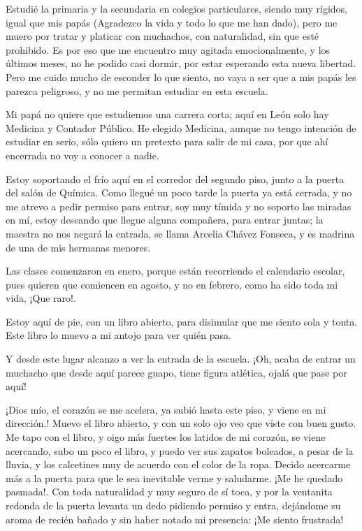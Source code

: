 \documentclass[letterpaper, 12pt]{book}
\begin{document}
Estudié la primaria y la secundaria en colegios particulares, siendo muy rígidos, igual que mis papás (Agradezco la vida y todo lo que me han dado), pero me muero por tratar y platicar con muchachos, con naturalidad, sin que esté prohibido. Es por eso que me encuentro muy agitada emocionalmente, y los últimos meses, no he podido casi dormir, por estar esperando esta nueva libertad. Pero me cuido mucho de esconder lo que siento, no vaya a ser que a mis papás les parezca peligroso, y no me permitan estudiar en esta escuela.

Mi papá no quiere que estudiemos una carrera corta; aquí en León solo hay Medicina y Contador Público. He elegido Medicina, aunque no tengo intención de estudiar en serio, sólo quiero un pretexto para salir de mi casa, por que ahí encerrada no voy a conocer a nadie.

Estoy soportando el frío aquí en el corredor del segundo piso, junto a la puerta del salón de Química. Como llegué un poco tarde la puerta ya está cerrada, y no me atrevo a pedir permiso para entrar, soy muy tímida y no soporto las miradas en mí, estoy deseando que llegue alguna compañera, para entrar juntas; la maestra no nos negará la entrada, se llama Arcelia Chávez Fonseca, y es madrina de una de mis hermanas menores.

Las clases comenzaron en enero, porque están recorriendo el calendario escolar, pues quieren que comiencen en agosto, y no en febrero, como ha sido toda mi vida, ¡Que raro!.

Estoy aquí de pie, con un libro abierto, para disimular que me siento sola y tonta. Este libro lo muevo a mi antojo para ver quién pasa.
 
Y desde este lugar alcanzo a ver la entrada de la escuela. ¡Oh, acaba de entrar un muchacho que desde aquí parece guapo, tiene figura atlética, ojalá que pase por aquí!

¡Dios mío, el corazón se me acelera, ya subió hasta este piso, y viene en mi dirección.! Muevo el libro abierto, y con un solo ojo veo que viste con buen gusto. Me tapo con el libro, y oigo más fuertes los latidos de mi corazón, se viene acercando, subo un poco el libro, y puedo ver sus zapatos boleados, a pesar de la lluvia, y los calcetines muy de acuerdo con el color de la ropa. Decido acercarme más a la puerta para que le sea inevitable verme y saludarme. ¡Me he quedado pasmada!. Con toda naturalidad y muy seguro de sí toca, y por la ventanita redonda de la puerta levanta un dedo pidiendo permiso y entra, dejándome su aroma de recién bañado y sin haber notado mi presencia: ¡Me siento frustrada!
\end{document}
